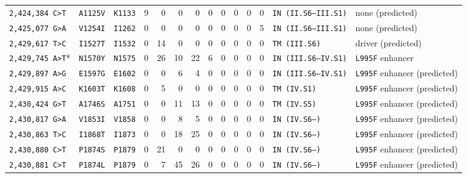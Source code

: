 \begin{tabular}{lllrrrrrrrrrll}
\texttt{2,424,384 C>T} & \texttt{A1125V} & \texttt{K1133} & 9 & 0 & 0 & 0 & 0 & 0 & 0 & 0 & 0 & \texttt{IN (II.S6--III.S1)} & none (predicted) \\

\texttt{2,425,077 G>A} & \texttt{V1254I} & \texttt{I1262} & 0 & 0 & 0 & 0 & 0 & 0 & 0 & 0 & 5 & \texttt{IN (II.S6--III.S1)} & none (predicted) \\

\texttt{2,429,617 T>C} & \texttt{I1527T} & \texttt{I1532} & 0 & 14 & 0 & 0 & 0 & 0 & 0 & 0 & 0 & \texttt{TM (III.S6)} & driver (predicted) \\

\texttt{2,429,745 A>T}* & \texttt{N1570Y} & \texttt{N1575} & 0 & 26 & 10 & 22 & 6 & 0 & 0 & 0 & 0 & \texttt{IN (III.S6--IV.S1)} & \texttt{L995F} enhancer \\

\texttt{2,429,897 A>G} & \texttt{E1597G} & \texttt{E1602} & 0 & 0 & 6 & 4 & 0 & 0 & 0 & 0 & 0 & \texttt{IN (III.S6--IV.S1)} & \texttt{L995F} enhancer (predicted) \\

\texttt{2,429,915 A>C} & \texttt{K1603T} & \texttt{K1608} & 0 & 5 & 0 & 0 & 0 & 0 & 0 & 0 & 0 & \texttt{TM (IV.S1)} & \texttt{L995F} enhancer (predicted) \\

\texttt{2,430,424 G>T} & \texttt{A1746S} & \texttt{A1751} & 0 & 0 & 11 & 13 & 0 & 0 & 0 & 0 & 0 & \texttt{TM (IV.S5)} & \texttt{L995F} enhancer (predicted) \\

\texttt{2,430,817 G>A} & \texttt{V1853I} & \texttt{V1858} & 0 & 0 & 8 & 5 & 0 & 0 & 0 & 0 & 0 & \texttt{IN (IV.S6--)} & \texttt{L995F} enhancer (predicted) \\

\texttt{2,430,863 T>C} & \texttt{I1868T} & \texttt{I1873} & 0 & 0 & 18 & 25 & 0 & 0 & 0 & 0 & 0 & \texttt{IN (IV.S6--)} & \texttt{L995F} enhancer (predicted) \\

\texttt{2,430,880 C>T} & \texttt{P1874S} & \texttt{P1879} & 0 & 21 & 0 & 0 & 0 & 0 & 0 & 0 & 0 & \texttt{IN (IV.S6--)} & \texttt{L995F} enhancer (predicted) \\

\texttt{2,430,881 C>T} & \texttt{P1874L} & \texttt{P1879} & 0 & 7 & 45 & 26 & 0 & 0 & 0 & 0 & 0 & \texttt{IN (IV.S6--)} & \texttt{L995F} enhancer (predicted) \\


\end{tabular}
